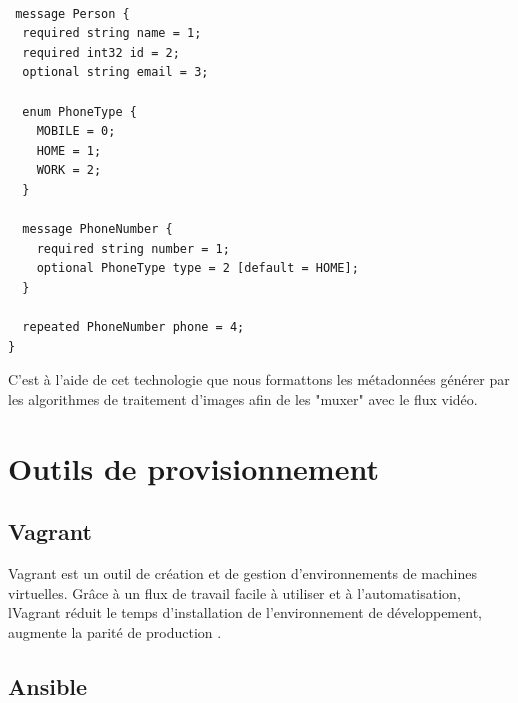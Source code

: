 \begin{lstlisting}[language=protobuf2,style=protobuf , frame=single,caption=modèle pour la structure d'un message,label=proto1]

 message Person {
  required string name = 1;
  required int32 id = 2;
  optional string email = 3;

  enum PhoneType {
    MOBILE = 0;
    HOME = 1;
    WORK = 2;
  }

  message PhoneNumber {
    required string number = 1;
    optional PhoneType type = 2 [default = HOME];
  }

  repeated PhoneNumber phone = 4;
}

\end{lstlisting}
C'est à l'aide de cet technologie que nous formattons les métadonnées générer par les algorithmes de traitement d'images afin de les "muxer" avec le flux vidéo.


\section{Outils de provisionnement}

\subsection{Vagrant}
Vagrant est un outil de création et de gestion d'environnements de machines virtuelles.
Grâce à un flux de travail facile à utiliser et à l'automatisation, lVagrant réduit le temps d'installation de l'environnement de développement, augmente la parité de production .
\subsection{Ansible}


